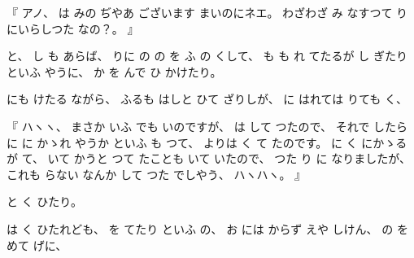 %
『
アノ、
%
は
みの
ぢやあ
ございます
まいのにネエ。
%
わざわざ%
み
なすつて
りにいらしつた
なの？。
』

%
と、
%
し
も
あらば、
%
りに
の
の
を
ふ
の
くして、
%
も
も
れ
てたるが
し
ぎたり
といふ
やうに、
%
か
を
んで
ひ
かけたり。

%
にも
けたる
ながら、
%
ふるも
はしと
ひて
ざりしが、
%
に
はれては
りても
く、

%
『
ハヽヽ、
%
まさか
いふ
でも
いのですが、
%
は
して
つたので、
%
それで
したら
に
に
かゝれ
やうか
といふ
も
つて、
%
よりは
く
て
たのです。
%
に
く
にかゝる
が
て、
%
いて
かうと
つて
たことも
いて
いたので、
%
つた
り
に
なりましたが、
%
これも
らない
なんか
して
つた
でしやう、%
%
ハヽハヽ。
』

%
と
く
ひたり。

%
は
く
ひたれども、
%
を
てたり
といふ
の、
%
お
には
からず
えや
しけん、
%
の
を
めて
げに、

